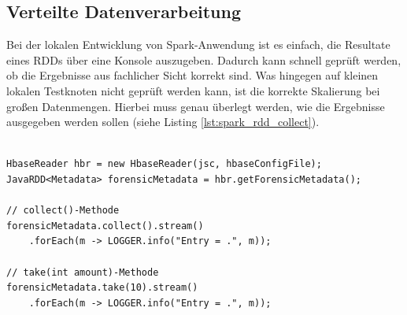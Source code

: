 \subsection*{Verteilte Datenverarbeitung}
Bei der lokalen Entwicklung von Spark-Anwendung ist es einfach, die Resultate eines RDDs über eine Konsole auszugeben. Dadurch kann schnell geprüft werden, ob die Ergebnisse aus fachlicher Sicht korrekt sind. Was hingegen auf kleinen lokalen Testknoten nicht geprüft werden kann, ist die korrekte Skalierung bei großen Datenmengen. Hierbei muss genau überlegt werden, wie die Ergebnisse ausgegeben werden sollen (siehe Listing \ref{lst:spark_rdd_collect}). 

\begin{lstlisting}[label={lst:spark_rdd_collect},caption= Anzeige der Ergebnisse eines Spark RDDs ,captionpos=b,frame=single,style=customjava]

HbaseReader hbr = new HbaseReader(jsc, hbaseConfigFile);
JavaRDD<Metadata> forensicMetadata = hbr.getForensicMetadata();

// collect()-Methode
forensicMetadata.collect().stream()
	.forEach(m -> LOGGER.info("Entry = .", m));

// take(int amount)-Methode	
forensicMetadata.take(10).stream()
	.forEach(m -> LOGGER.info("Entry = .", m));	
\end{lstlisting}

